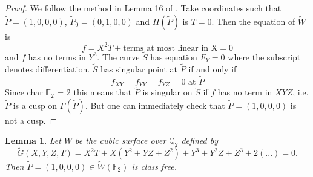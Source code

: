 \documentclass[11pt]{article}
\newtheorem{lemma}[theorem]{Lemma}
\theoremstyle{definition}
\begin{document}
\begin{proof}
We follow the method in Lemma 16 of \cite{swinnertondyer}.
Take coordinates such that $\tilde P = (1,0,0,0)$, $\tilde P_0 = (0,1,0,0)$ and $\Pi(\tilde P)$ is $T = 0$. Then the equation of $\tilde W$ is
\begin{equation}
\label{f}
    f = X^2T + \text{terms at most linear in X} = 0 
\end{equation}
and $f$ has no terms in $Y^3$. The curve $\tilde S$ has equation $F_Y = 0$ where the subscript denotes differentiation.  $\tilde S$ has singular point at $\tilde P$ if and only if
\begin{equation}
    \label{fxy}
    f_{XY} = f_{YY} = f_{YZ} = 0 \text{ at } \tilde P
\end{equation}
Since char $\mathbb{F}_2$ = 2 this means that $\tilde P$ is singular on $\tilde S$ if $f$ has no 
term in $XYZ$, i.e. $\tilde P$ is a cusp on $\Gamma(\tilde P)$. But one can immediately check that
$\tilde P = (1, 0, 0, 0)$ is not a cusp.
\end{proof}
\begin{lemma}
\label{thm:one-pt-class-free}
Let $W$ be the cubic surface over $\mathbb{Q}_2$ defined by
\begin{equation}
    \label{G}
        \tilde G(X, Y, Z, T) = X^2T + X(Y^2 + YZ + Z^2) + Y^3 + Y^2Z + Z^3 + 2(...)= 0.
\end{equation}
Then $\tilde{P} = (1, 0, 0, 0) \in \tilde W(\mathbb{F}_2)$ is class free.
\end{lemma}
\end{document}
